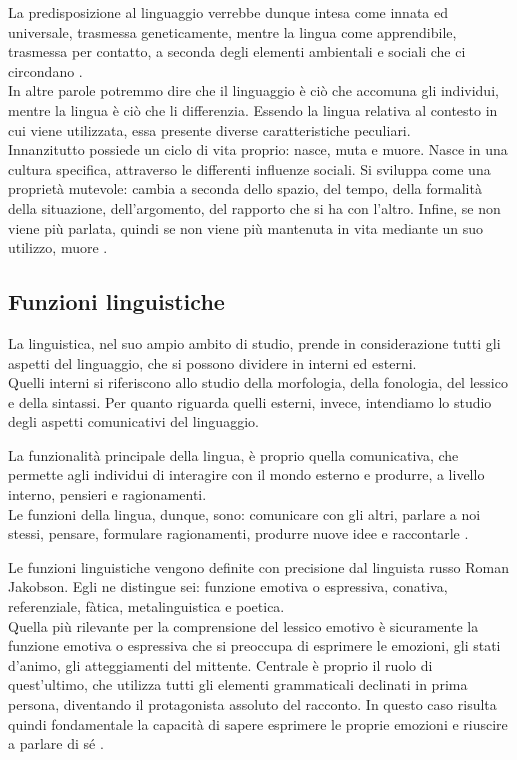 La predisposizione al linguaggio verrebbe dunque intesa come innata ed universale, trasmessa geneticamente, mentre la lingua come apprendibile, trasmessa per contatto, a seconda degli elementi ambientali e sociali che ci circondano \parencite{chomsky_predisposizione_linguaggio}. \\
In altre parole potremmo dire che il linguaggio è ciò che accomuna gli individui, mentre la lingua è ciò che li differenzia. Essendo la lingua relativa al contesto in cui viene utilizzata, essa presente diverse caratteristiche peculiari. \\
Innanzitutto possiede un ciclo di vita proprio: nasce, muta e muore. Nasce in una cultura specifica, attraverso le differenti influenze sociali. Si sviluppa come una proprietà mutevole: cambia a seconda dello spazio, del tempo, della formalità della situazione, dell’argomento, del rapporto che si ha con l’altro. Infine, se non viene più parlata, quindi se non viene più mantenuta in vita mediante un suo utilizzo, muore \parencite{lingue_e_linguaggio}.

\subsection{Funzioni linguistiche}
La linguistica, nel suo ampio ambito di studio, prende in considerazione tutti gli aspetti del linguaggio, che si possono dividere in interni ed esterni.\\
Quelli interni si riferiscono allo studio della morfologia, della fonologia, del lessico e della sintassi. Per quanto riguarda quelli esterni, invece, intendiamo lo studio degli aspetti comunicativi del linguaggio. 

La funzionalità principale della lingua, è proprio quella comunicativa, che permette agli individui di interagire con il mondo esterno e produrre, a livello interno, pensieri e ragionamenti.\\
Le funzioni della lingua, dunque, sono: comunicare con gli altri, parlare a noi stessi, pensare, formulare ragionamenti, produrre nuove idee e raccontarle \parencite{fondamenti_linguistica}.

Le funzioni linguistiche vengono definite con precisione dal linguista russo Roman Jakobson. Egli ne distingue sei: funzione emotiva o espressiva, conativa, referenziale, fàtica, metalinguistica e poetica.\\
Quella più rilevante per la comprensione del lessico emotivo è sicuramente la funzione emotiva o espressiva che si preoccupa di esprimere le emozioni, gli stati d'animo, gli atteggiamenti del mittente. Centrale è proprio il ruolo di quest'ultimo, che utilizza tutti gli elementi grammaticali declinati in prima persona, diventando il protagonista assoluto del racconto. In questo caso risulta quindi fondamentale la capacità di sapere esprimere le proprie emozioni e riuscire a parlare di sé \parencite{Jakobson}.

